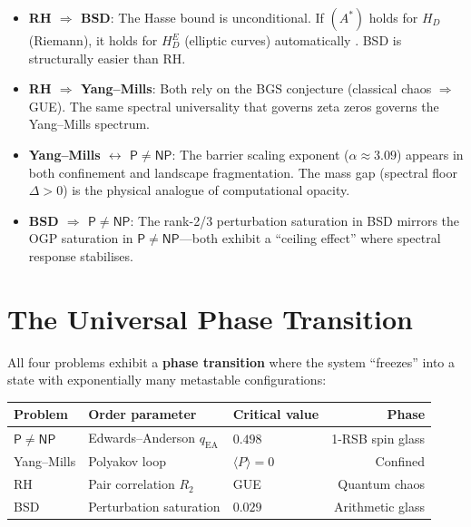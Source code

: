 \documentclass[11pt,a4paper]{article}
\theoremstyle{plain}
\theoremstyle{definition}
\theoremstyle{remark}
\begin{document}
\begin{itemize}[nosep]
\item \textbf{RH $\Rightarrow$ BSD}: The Hasse bound is unconditional. If $(A^*)$ holds for $H_D$ (Riemann), it holds for $H_D^E$ (elliptic curves) automatically \cite{DWR_BSD2026}. BSD is structurally easier than RH.
\item \textbf{RH $\Rightarrow$ Yang--Mills}: Both rely on the BGS conjecture (classical chaos $\Rightarrow$ GUE). The same spectral universality that governs zeta zeros governs the Yang--Mills spectrum.
\item \textbf{Yang--Mills $\leftrightarrow$ $\mathsf{P} \neq \mathsf{NP}$}: The barrier scaling exponent ($\alpha \approx 3.09$) appears in both confinement and landscape fragmentation. The mass gap (spectral floor $\Delta > 0$) is the physical analogue of computational opacity.
\item \textbf{BSD $\Rightarrow$ $\mathsf{P} \neq \mathsf{NP}$}: The rank-2/3 perturbation saturation in BSD mirrors the OGP saturation in $\mathsf{P} \neq \mathsf{NP}$---both exhibit a ``ceiling effect'' where spectral response stabilises.
\end{itemize}

\section{The Universal Phase Transition}

All four problems exhibit a \textbf{phase transition} where the system ``freezes'' into a state with exponentially many metastable configurations:

\begin{center}\small
\begin{tabular}{lllr}
\toprule
Problem & Order parameter & Critical value & Phase \\
\midrule
$\mathsf{P} \neq \mathsf{NP}$ & Edwards--Anderson $q_{\text{EA}}$ & $0.498$ & 1-RSB spin glass \\
Yang--Mills & Polyakov loop & $\langle P \rangle = 0$ & Confined \\
RH & Pair correlation $R_2$ & GUE & Quantum chaos \\
BSD & Perturbation saturation & $0.029$ & Arithmetic glass \\
\bottomrule
\end{tabular}
\end{center}
\end{document}
